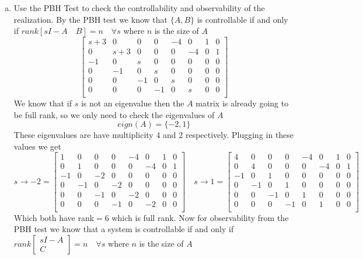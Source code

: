 \documentclass{article}
\begin{document}
\begin{enumerate}[(a)]
\item Use the PBH Test to check the controllability and observability of the realization.
\newline
By the PBH test we know that $\{A,B\}$ is controllable if and only if $rank[sI-A \quad B] = n \quad \forall s$ where $n$ is the size of $A$
$$
\begin{bmatrix}
s+3 &   0 & 0 & 0 &-4 & 0 & 1 & 0\\
  0 & s+3 & 0 & 0 & 0 &-4 & 0 & 1\\
 -1 &   0 & s & 0 & 0 & 0 & 0 & 0\\
  0 &  -1 & 0 & s & 0 & 0 & 0 & 0\\
  0 &   0 &-1 & 0 & s & 0 & 0 & 0\\
  0 &   0 & 0 &-1 & 0 & s & 0 & 0\\
\end{bmatrix}
$$
We know that if $s$ is not an eigenvalue then the $A$ matrix is already going to be full rank, so we only need to check the eigenvalues of $A$
$$eign(A) = \{ -2, 1 \}$$
These eigenvalues are have multiplicity 4 and 2 respectively.
Plugging in these values we get
$$
s \to -2 =
\begin{bmatrix}
  1 &   0 & 0 & 0 &-4 & 0 & 1 & 0\\
  0 &   1 & 0 & 0 & 0 &-4 & 0 & 1\\
 -1 &   0 &-2 & 0 & 0 & 0 & 0 & 0\\
  0 &  -1 & 0 &-2 & 0 & 0 & 0 & 0\\
  0 &   0 &-1 & 0 &-2 & 0 & 0 & 0\\
  0 &   0 & 0 &-1 & 0 &-2 & 0 & 0\\
\end{bmatrix}
\quad
s \to 1 =
\begin{bmatrix}
  4 &   0 & 0 & 0 &-4 & 0 & 1 & 0\\
  0 &   4 & 0 & 0 & 0 &-4 & 0 & 1\\
 -1 &   0 & 1 & 0 & 0 & 0 & 0 & 0\\
  0 &  -1 & 0 & 1 & 0 & 0 & 0 & 0\\
  0 &   0 &-1 & 0 & 1 & 0 & 0 & 0\\
  0 &   0 & 0 &-1 & 0 & 1 & 0 & 0\\
\end{bmatrix}
$$
Which both have rank$= 6$ which is full rank.
\newline
Now for observability from the PBH test we know that a system is controllable if and only if $rank\begin{bmatrix} sI-A \\ C \end{bmatrix} = n \quad \forall s$ where $n$ is the size of $A$

\end{enumerate}
\end{document}

